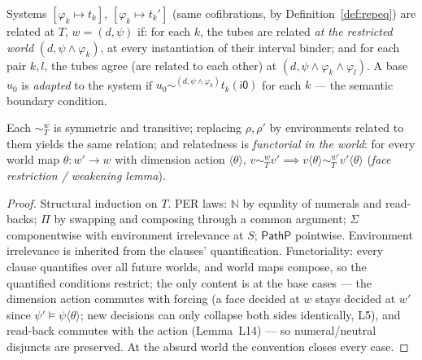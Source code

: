 \documentclass{lmcs}
\newcommand{\io}{\mathsf{i0}}
\begin{document}
\begin{defi}\label{def:relsys}
  Systems $[\varphi_k \mapsto t_k]$, $[\varphi_k \mapsto t_k']$
  (same cofibrations, by Definition~\ref{def:repeq}) are related at
  $T$, $w = (d, \psi)$ if: for each $k$, the tubes are related
  \emph{at the restricted world} $(d, \psi \wedge \varphi_k)$, at
  every instantiation of their interval binder; and for each pair
  $k, l$, the tubes agree (are related to each other) at
  $(d, \psi \wedge \varphi_k \wedge \varphi_l)$.  A base $u_0$ is
  \emph{adapted} to the system if
  $u_0 \sim^{(d, \psi \wedge \varphi_k)} t_k(\io)$ for each $k$ ---
  the semantic boundary condition.
\end{defi}

\begin{lem}\label{lem:coreper}
  Each $\sim^w_T$ is symmetric and transitive; replacing $\rho,
  \rho'$ by environments related to them yields the same relation;
  and relatedness is \emph{functorial in the world}: for every
  world map $\theta : w' \to w$ with dimension action
  $\langle\theta\rangle$,
  $v \sim^w_T v' \implies
  v\langle\theta\rangle \sim^{w'}_{T} v'\langle\theta\rangle$
  (\emph{face restriction / weakening lemma}).
\end{lem}
\begin{proof}
  Structural induction on $T$.  PER laws: $\mathbb{N}$ by equality
  of numerals and read-backs; $\Pi$ by swapping and composing
  through a common argument; $\Sigma$ componentwise with
  environment irrelevance at $S$; $\mathsf{PathP}$ pointwise.
  Environment irrelevance is inherited from the clauses'
  quantification.  Functoriality: every clause quantifies over all
  future worlds, and world maps compose, so the quantified
  conditions restrict; the only content is at the base cases ---
  the dimension action commutes with forcing (a face decided at
  $w$ stays decided at $w'$ since
  $\psi' \models \psi\langle\theta\rangle$; new decisions can only
  collapse both sides identically, L5), and read-back commutes with
  the action (Lemma~L14) --- so numeral/neutral disjuncts are
  preserved.  At the absurd world the convention closes every case.
\end{proof}
\end{document}
